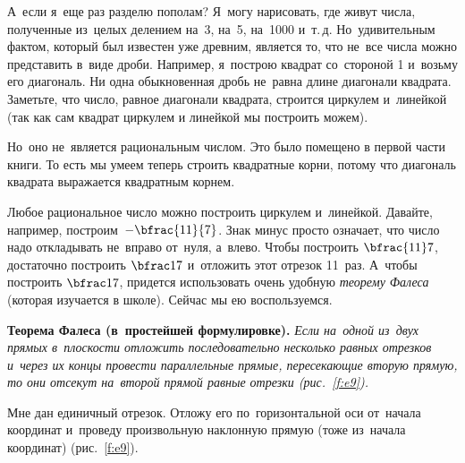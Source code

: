 
А~если я~еще раз разделю пополам? Я~могу нарисовать, где живут числа, полученные из~целых делением
на~3, на~5, на~1000 и~т.\,д. Но~удивительным фактом, который был известен уже древним, является то,
что не~все числа можно представить в~виде дроби. Например, я~построю квадрат со~стороной 1 и~возьму
его диагональ. Ни одна обыкновенная дробь не~равна длине диагонали квадрата. Заметьте, что число,
равное диагонали квадрата, строится циркулем и~линейкой (так как сам квадрат циркулем и линейкой мы построить можем).



Но~оно не~является рациональным числом. Это было помещено в первой части книги. То есть мы умеем теперь строить квадратные корни, потому
что диагональ квадрата выражается квадратным корнем.

Любое рациональное число можно построить циркулем и~линейкой. Давайте, например, построим~$-\bfrac{11}{7}$.
Знак минус просто означает, что число надо откладывать не~вправо от~нуля, а~влево. Чтобы построить
$\bfrac{11}7$, достаточно построить $\bfrac17$ и~отложить этот отрезок 11~раз. А~чтобы построить $\bfrac17$, придется
использовать очень удобную \textit{теорему Фалеса} (которая изучается в школе). Сейчас мы ею воспользуемся.


\textbf{Теорема Фалеса (в~простейшей формулировке).} \textit{Если на~одной из~двух прямых в~плоскости отложить
последовательно несколько равных отрезков и~через их концы провести параллельные прямые,
пересекающие вторую прямую, то они отсекут на~второй прямой равные отрезки (рис.~\ref{f:e9}).}


Мне дан единичный отрезок. Отложу его по~горизонтальной оси от~начала координат и~проведу произвольную
наклонную прямую (тоже из~начала координат) (рис.~\ref{f:e9}).


